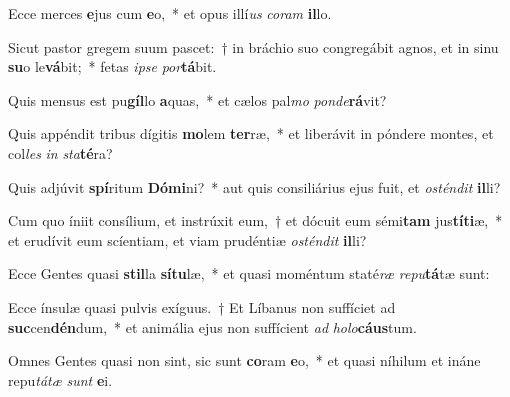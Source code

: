\item Ecce merces \textbf{e}jus cum \textbf{e}o,~* et opus illí\textit{us} \textit{co}\textit{ram} \textbf{il}lo.
\item Sicut pastor gregem suum pascet:~† in bráchio suo congregábit agnos, et in sinu \textbf{su}o le\textbf{vá}bit;~* fetas \textit{ip}\textit{se} \textit{por}\textbf{tá}bit.
\item Quis mensus est pu\textbf{gíl}lo \textbf{a}quas,~* et cælos pal\textit{mo} \textit{pon}\textit{de}\textbf{rá}vit?
\item Quis appéndit tribus dígitis \textbf{mo}lem \textbf{ter}ræ,~* et liberávit in póndere montes, et col\textit{les} \textit{in} \textit{sta}\textbf{té}ra?
\item Quis adjúvit \textbf{spí}ritum \textbf{Dó}\textbf{mi}ni?~* aut quis consiliárius ejus fuit, et \textit{os}\textit{tén}\textit{dit} \textbf{il}li?
\item Cum quo íniit consílium, et instrúxit eum,~† et dócuit eum sémi\textbf{tam} jus\textbf{tí}\textbf{ti}æ,~* et erudívit eum scíentiam, et viam prudéntiæ \textit{os}\textit{tén}\textit{dit} \textbf{il}li?
\item Ecce Gentes quasi \textbf{stil}la \textbf{sí}\textbf{tu}læ,~* et quasi moméntum staté\textit{ræ} \textit{re}\textit{pu}\textbf{tá}tæ sunt:
\item Ecce ínsulæ quasi pulvis exíguus.~† Et Líbanus non suffíciet ad \textbf{suc}cen\textbf{dén}dum,~* et animália ejus non suffícient \textit{ad} \textit{ho}\textit{lo}\textbf{cáus}tum.
\item Omnes Gentes quasi non sint, sic sunt \textbf{co}ram \textbf{e}o,~* et quasi níhilum et ináne repu\textit{tá}\textit{tæ} \textit{sunt} \textbf{e}i.
